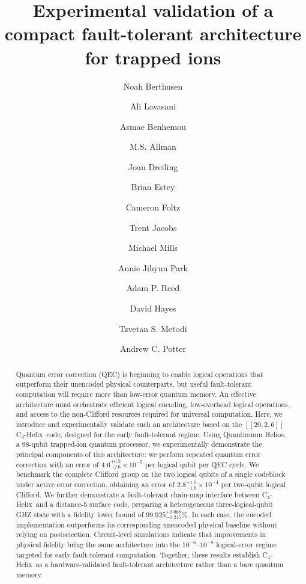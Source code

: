 \documentclass[aps,prx,reprint,showpacs,twocolumn,superscriptaddress,eqsecnum]{revtex4-2}
\newcommand{\chelix}{C$_4$-Helix}
\begin{document}
\title{Experimental validation of a compact fault-tolerant architecture for trapped ions}

\author{Noah Berthusen}
\author{Ali Lavasani}
\author{Asmae Benhemou}
\author{M.S. Allman}
\author{Joan Dreiling}
\author{Brian Estey}
\author{Cameron Foltz}
\author{Trent Jacobs}
\author{Michael Mills}
\author{Annie Jihyun Park}
\author{Adam P. Reed}
\author{David Hayes}
\author{Tzvetan S. Metodi}
\author{Andrew C. Potter}

\begin{abstract}
Quantum error correction (QEC) is beginning to enable logical operations that outperform their unencoded physical counterparts, but useful fault-tolerant computation will require more than low-error quantum memory. An effective architecture must orchestrate efficient logical encoding, low-overhead logical operations, and access to the non-Clifford resources required for universal computation. Here, we introduce and experimentally validate such an architecture based on the $[[20,2,6]]$ \chelix\ code, designed for the early fault-tolerant regime. Using Quantinuum Helios, a 98-qubit trapped-ion quantum processor, we experimentally demonstrate the principal components of this architecture: we perform repeated quantum error correction with an error of $4.6^{+6.2}_{-2.6}\times10^{-5}$ per logical qubit per QEC cycle. We benchmark the complete Clifford group on the two logical qubits of a single codeblock under active error correction, obtaining an error of $2.8^{+1.0}_{-1.6}\times 10^{-4}$ per two-qubit logical Clifford. We further demonstrate a fault-tolerant chain-map interface between \chelix\ and a distance-5 surface code, preparing a heterogeneous three-logical-qubit GHZ state with a fidelity lower bound of $99.925^{+0.068}_{-0.245}\%$. In each case, the encoded implementation outperforms its corresponding unencoded physical baseline without relying on postselection. Circuit-level simulations indicate that improvements in physical fidelity bring the same architecture into the $10^{-6}$--$10^{-8}$ logical-error regime targeted for early fault-tolerant computation. Together, these results establish \chelix\ as a hardware-validated fault-tolerant architecture rather than a bare quantum memory.
\end{abstract}
\end{document}
